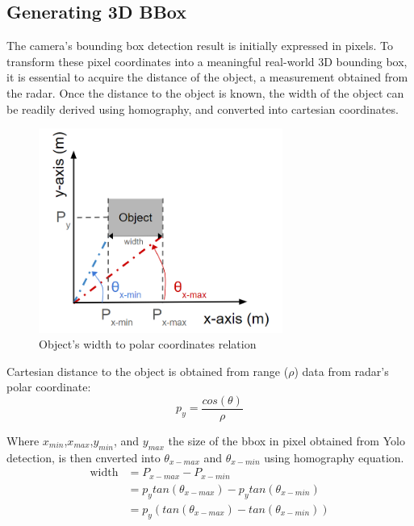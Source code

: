 \subsection{Generating 3D BBox}\label{subsec:2-4-generating-bbox}
The camera's bounding box detection result is initially expressed in pixels. 
To transform these pixel coordinates into a meaningful real-world 3D bounding box, 
it is essential to acquire the distance of the object, a measurement obtained from the radar. 
Once the distance to the object is known, the width of the object can be readily derived using homography, 
and converted into cartesian coordinates.
\begin{figure}[hpbt]
    \centering
    \includegraphics[width=8cm]{Figures/cart_width.png}%
    \caption{Object's width to polar coordinates relation}
    \label{fig:cart_width}
\end{figure}

Cartesian distance to the object is obtained from range ($\rho$) data from radar's polar coordinate:
\begin{equation}\label{equ:2_py_rho}
    p_y=
    \frac
    {cos(\theta)}
    {\rho}
\end{equation}

Where $x_{min}$,$x_{max}$,$y_{min}$, and $y_{max}$ the size of the bbox in pixel obtained from Yolo detection,
is then cnverted  into $\theta_{x-max}$ and $\theta_{x-min}$ using homography equation.
\begin{equation}\label{equ:2_cam_width}
    \begin{split}
    \text{width}&=P_{x-max}-P_{x-min}\\
                &=p_y tan(\theta_{x-max}) - p_y tan(\theta_{x-min})\\
                &=p_y (tan(\theta_{x-max}) - tan(\theta_{x-min}))
    \end{split}
\end{equation}

